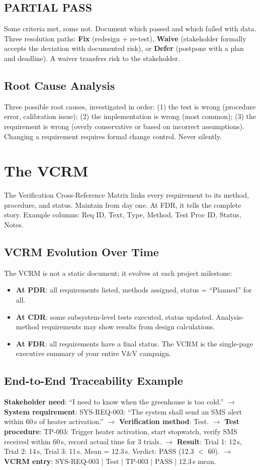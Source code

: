 \documentclass[11pt,letterpaper,twoside,openany]{book}
\begin{document}
\subsection{PARTIAL PASS}
Some criteria met, some not. Document which passed and which failed with data. Three resolution paths: \textbf{Fix} (redesign + re-test), \textbf{Waive} (stakeholder formally accepts the deviation with documented risk), or \textbf{Defer} (postpone with a plan and deadline). A waiver transfers risk to the stakeholder.

\subsection{Root Cause Analysis}
Three possible root causes, investigated in order: (1) the test is wrong (procedure error, calibration issue); (2) the implementation is wrong (most common); (3) the requirement is wrong (overly conservative or based on incorrect assumptions). Changing a requirement requires formal change control. Never silently.

\section{The VCRM}
The Verification Cross-Reference Matrix links every requirement to its method, procedure, and status. Maintain from day one. At FDR, it tells the complete story. Example columns: Req ID, Text, Type, Method, Test Proc ID, Status, Notes.


\subsection{VCRM Evolution Over Time}
The VCRM is not a static document; it evolves at each project milestone:
\begin{itemize}[nosep,leftmargin=1.5em]
\item \textbf{At PDR}: all requirements listed, methods assigned, status = ``Planned'' for all.
\item \textbf{At CDR}: some subsystem-level tests executed, status updated. Analysis-method requirements may show results from design calculations.
\item \textbf{At FDR}: all requirements have a final status. The VCRM is the single-page executive summary of your entire V\&V campaign.
\end{itemize}

\subsection{End-to-End Traceability Example}
\textbf{Stakeholder need}: ``I need to know when the greenhouse is too cold.'' $\to$ \textbf{System requirement}: SYS-REQ-003: ``The system shall send an SMS alert within 60\,s of heater activation.'' $\to$ \textbf{Verification method}: Test. $\to$ \textbf{Test procedure}: TP-003: Trigger heater activation, start stopwatch, verify SMS received within 60\,s, record actual time for 3 trials. $\to$ \textbf{Result}: Trial 1: 12\,s, Trial 2: 14\,s, Trial 3: 11\,s. Mean = 12.3\,s. Verdict: PASS (12.3 $<$ 60). $\to$ \textbf{VCRM entry}: SYS-REQ-003 | Test | TP-003 | PASS | 12.3\,s mean.
\end{document}
